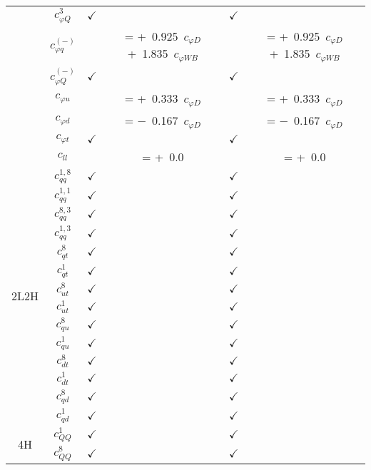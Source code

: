 \documentclass{article}
\begin{document}
\begin{table}[H]
\begin{tabular}{|c|c|c|c|c|c|}
 & $c_{\varphi Q}^{3}$ & $\checkmark$ &  & $\checkmark$ & \\ \cline{2-6}
 & $c_{\varphi q}^{(-)}$ & & = +\ 0.925\ $c_{\varphi D}$+\ 1.835\ $c_{\varphi WB}$ & & = +\ 0.925\ $c_{\varphi D}$+\ 1.835\ $c_{\varphi WB}$\\ \cline{2-6}
 & $c_{\varphi Q}^{(-)}$ & $\checkmark$ &  & $\checkmark$ & \\ \cline{2-6}
 & $c_{\varphi u}$ & & = +\ 0.333\ $c_{\varphi D}$ & & = +\ 0.333\ $c_{\varphi D}$\\ \cline{2-6}
 & $c_{\varphi d}$ & & = $-$\ 0.167\ $c_{\varphi D}$ & & = $-$\ 0.167\ $c_{\varphi D}$\\ \cline{2-6}
 & $c_{\varphi t}$ & $\checkmark$ &  & $\checkmark$ & \\ \cline{2-6}
 & $c_{ll}$ & & = +\ 0.0 & & = +\ 0.0
\\ \hline
\multirow{14}{*}{2L2H}
 & $c_{qq}^{1,8}$ & $\checkmark$ &  & $\checkmark$ & \\ \cline{2-6}
 & $c_{qq}^{1,1}$ & $\checkmark$ &  & $\checkmark$ & \\ \cline{2-6}
 & $c_{qq}^{8,3}$ & $\checkmark$ &  & $\checkmark$ & \\ \cline{2-6}
 & $c_{qq}^{1,3}$ & $\checkmark$ &  & $\checkmark$ & \\ \cline{2-6}
 & $c_{qt}^{8}$ & $\checkmark$ &  & $\checkmark$ & \\ \cline{2-6}
 & $c_{qt}^{1}$ & $\checkmark$ &  & $\checkmark$ & \\ \cline{2-6}
 & $c_{ut}^{8}$ & $\checkmark$ &  & $\checkmark$ & \\ \cline{2-6}
 & $c_{ut}^{1}$ & $\checkmark$ &  & $\checkmark$ & \\ \cline{2-6}
 & $c_{qu}^{8}$ & $\checkmark$ &  & $\checkmark$ & \\ \cline{2-6}
 & $c_{qu}^{1}$ & $\checkmark$ &  & $\checkmark$ & \\ \cline{2-6}
 & $c_{dt}^{8}$ & $\checkmark$ &  & $\checkmark$ & \\ \cline{2-6}
 & $c_{dt}^{1}$ & $\checkmark$ &  & $\checkmark$ & \\ \cline{2-6}
 & $c_{qd}^{8}$ & $\checkmark$ &  & $\checkmark$ & \\ \cline{2-6}
 & $c_{qd}^{1}$ & $\checkmark$ &  & $\checkmark$ &
\\ \hline
\multirow{5}{*}{4H}
 & $c_{QQ}^{1}$ & $\checkmark$ &  & $\checkmark$ & \\ \cline{2-6}
 & $c_{QQ}^{8}$ & $\checkmark$ &  & $\checkmark$ & \\ \cline{2-6}

\end{tabular}
\end{table}
\end{document}
